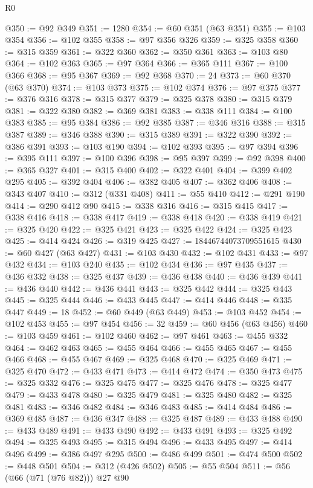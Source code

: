 \begin{lexlean}{R0}
\begin{coremodule}
@350 := @92 @349
@351 := 1280
@354 := @60 @351 (@63 @351)
@355 := @103 @354
@356 := @102 @355
@358 := @97 @356 @326
@359 := @325 @358
@360 := @315 @359
@361 := @322 @360
@362 := @350 @361
@363 := @103 @80
@364 := @102 @363
@365 := @97 @364
@366 := @365 @111
@367 := @100 @366
@368 := @95 @367
@369 := @92 @368
@370 := 24
@373 := @60 @370 (@63 @370)
@374 := @103 @373
@375 := @102 @374
@376 := @97 @375
@377 := @376 @316
@378 := @315 @377
@379 := @325 @378
@380 := @315 @379
@381 := @322 @380
@382 := @369 @381
@383 := @338 @111
@384 := @100 @383
@385 := @95 @384
@386 := @92 @385
@387 := @346 @316
@388 := @315 @387
@389 := @346 @388
@390 := @315 @389
@391 := @322 @390
@392 := @386 @391
@393 := @103 @190
@394 := @102 @393
@395 := @97 @394
@396 := @395 @111
@397 := @100 @396
@398 := @95 @397
@399 := @92 @398
@400 := @365 @327
@401 := @315 @400
@402 := @322 @401
@404 := @399 @402 @295
@405 := @392 @404
@406 := @382 @405
@407 := @362 @406
@408 := @343 @407
@410 := @312 (@331 @408)
@411 := @55 @410
@412 := @291 @190
@414 := @290 @412 @90
@415 := @338 @316
@416 := @315 @415
@417 := @338 @416
@418 := @338 @417
@419 := @338 @418
@420 := @338 @419
@421 := @325 @420
@422 := @325 @421
@423 := @325 @422
@424 := @325 @423
@425 := @414 @424
@426 := @319 @425
@427 := 18446744073709551615
@430 := @60 @427 (@63 @427)
@431 := @103 @430
@432 := @102 @431
@433 := @97 @432
@434 := @103 @240
@435 := @102 @434
@436 := @97 @435
@437 := @436 @332
@438 := @325 @437
@439 := @436 @438
@440 := @436 @439
@441 := @436 @440
@442 := @436 @441
@443 := @325 @442
@444 := @325 @443
@445 := @325 @444
@446 := @433 @445
@447 := @414 @446
@448 := @335 @447
@449 := 18
@452 := @60 @449 (@63 @449)
@453 := @103 @452
@454 := @102 @453
@455 := @97 @454
@456 := 32
@459 := @60 @456 (@63 @456)
@460 := @103 @459
@461 := @102 @460
@462 := @97 @461
@463 := @455 @332
@464 := @462 @463
@465 := @455 @464
@466 := @455 @465
@467 := @455 @466
@468 := @455 @467
@469 := @325 @468
@470 := @325 @469
@471 := @325 @470
@472 := @433 @471
@473 := @414 @472
@474 := @350 @473
@475 := @325 @332
@476 := @325 @475
@477 := @325 @476
@478 := @325 @477
@479 := @433 @478
@480 := @325 @479
@481 := @325 @480
@482 := @325 @481
@483 := @346 @482
@484 := @346 @483
@485 := @414 @484
@486 := @369 @485
@487 := @436 @347
@488 := @325 @487
@489 := @433 @488
@490 := @433 @489
@491 := @433 @490
@492 := @433 @491
@493 := @325 @492
@494 := @325 @493
@495 := @315 @494
@496 := @433 @495
@497 := @414 @496
@499 := @386 @497 @295
@500 := @486 @499
@501 := @474 @500
@502 := @448 @501
@504 := @312 (@426 @502)
@505 := @55 @504
@511 := @56 (@66 (@71 (@76 @82))) @27 @90

\end{coremodule}
\end{lexlean}

